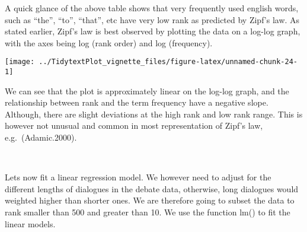 \documentclass[
]{article}
\newenvironment{Shaded}{\begin{snugshade}}{\end{snugshade}}
\newcommand{\DataTypeTok}[1]{\textcolor[rgb]{0.13,0.29,0.53}{#1}}
\newcommand{\DecValTok}[1]{\textcolor[rgb]{0.00,0.00,0.81}{#1}}
\newcommand{\FloatTok}[1]{\textcolor[rgb]{0.00,0.00,0.81}{#1}}
\newcommand{\KeywordTok}[1]{\textcolor[rgb]{0.13,0.29,0.53}{\textbf{#1}}}
\newcommand{\NormalTok}[1]{#1}
\newcommand{\OperatorTok}[1]{\textcolor[rgb]{0.81,0.36,0.00}{\textbf{#1}}}
\newcommand{\OtherTok}[1]{\textcolor[rgb]{0.56,0.35,0.01}{#1}}
\newcommand{\StringTok}[1]{\textcolor[rgb]{0.31,0.60,0.02}{#1}}
\begin{document}
A quick glance of the above table shows that very frequently used
english words, such as ``the'', ``to'', ``that'', etc have very low rank
as predicted by Zipf's law. As stated earlier, Zipf's law is best
observed by plotting the data on a log-log graph, with the axes being
log (rank order) and log (frequency).

\begin{Shaded}
\end{Shaded}

\begin{center}\texttt{[image: ../TidytextPlot\_vignette\_files/figure-latex/unnamed-chunk-24-1]} \end{center}

We can see that the plot is approximately linear on the log-log graph,
and the relationship between rank and the term frequency have a negative
slope. Although, there are slight deviations at the high rank and low
rank range. This is however not unusual and common in most
representation of Zipf's law, e.g.~(Adamic.2000).

~

Lets now fit a linear regression model. We however need to adjust for
the different lengths of dialogues in the debate data, otherwise, long
dialogues would weighted higher than shorter ones. We are therefore
going to subset the data to rank smaller than 500 and greater than 10.
We use the function lm() to fit the linear models.

\begin{Shaded}
\end{Shaded}
\end{document}

